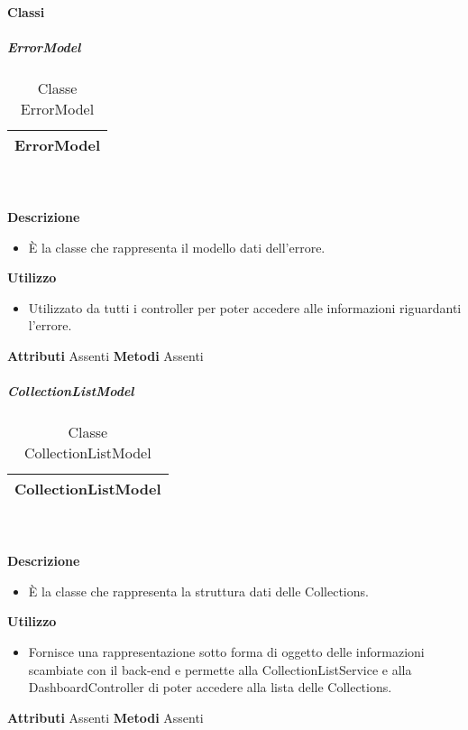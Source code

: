 		\paragraph{Classi}
			\subparagraph{ErrorModel} 
\begin{table}[ht]
\begin{center}
\bgroup
	\setlength{\arrayrulewidth}{0.6mm}
	\def\arraystretch{1}
		\begin{tabular}{ | p{12cm} | }
				\hline  
					\centerline{\textbf{ErrorModel}}
		\\ \hline 
				\hline
				\hline
		
		\end{tabular}
\egroup
\caption{Classe ErrorModel}
\end{center}
\end{table} \textbf{\\ \\ Descrizione}
\begin{itemize}
\item[] È la classe che rappresenta il modello dati dell'errore.
\end{itemize} 
\textbf{Utilizzo}
\begin{itemize}
\item[] Utilizzato da tutti i controller per poter accedere alle informazioni riguardanti l'errore.
\end{itemize}
\textbf{Attributi}
Assenti
\textbf{Metodi}
Assenti

			\subparagraph{CollectionListModel} 
\begin{table}[ht]
\begin{center}
\bgroup
	\setlength{\arrayrulewidth}{0.6mm}
	\def\arraystretch{1}
		\begin{tabular}{ | p{12cm} | }
				\hline  
					\centerline{\textbf{CollectionListModel}}
		\\ \hline 
				\hline
				\hline
		
		\end{tabular}
\egroup
\caption{Classe CollectionListModel}
\end{center}
\end{table} \textbf{\\ \\ Descrizione}
\begin{itemize}
\item[] È la classe che rappresenta la struttura dati delle Collections.
\end{itemize} 
\textbf{Utilizzo}
\begin{itemize}
\item[] Fornisce una rappresentazione sotto forma di oggetto delle informazioni scambiate con il back-end e permette alla CollectionListService e alla DashboardController di poter accedere alla lista delle Collections.
\end{itemize}
\textbf{Attributi}
Assenti
\textbf{Metodi}
Assenti


